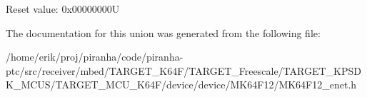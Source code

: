 Reset value\+: 0x00000000U

The documentation for this union was generated from the following file\+:\begin{DoxyCompactItemize}
\item 
/home/erik/proj/piranha/code/piranha-\/ptc/src/receiver/mbed/\+T\+A\+R\+G\+E\+T\+\_\+\+K64\+F/\+T\+A\+R\+G\+E\+T\+\_\+\+Freescale/\+T\+A\+R\+G\+E\+T\+\_\+\+K\+P\+S\+D\+K\+\_\+\+M\+C\+U\+S/\+T\+A\+R\+G\+E\+T\+\_\+\+M\+C\+U\+\_\+\+K64\+F/device/device/\+M\+K64\+F12/M\+K64\+F12\+\_\+enet.\+h\end{DoxyCompactItemize}
